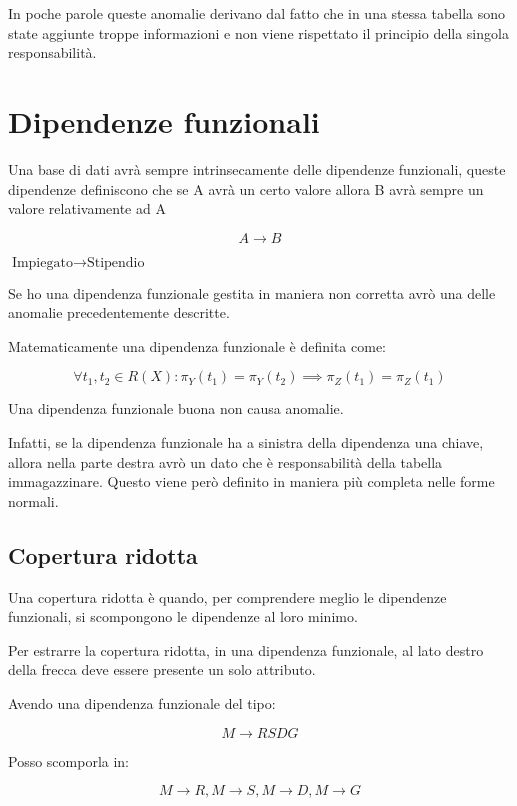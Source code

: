 In poche parole queste anomalie derivano dal fatto che in una stessa tabella sono state aggiunte troppe informazioni e non viene rispettato il principio della singola responsabilità.

\section{Dipendenze funzionali}

Una base di dati avrà sempre intrinsecamente delle dipendenze funzionali, queste dipendenze definiscono che se A avrà un certo valore allora B avrà sempre un valore relativamente ad A

\[ A \rightarrow B\]

\begin{exmp}
    $\text{Impiegato} \rightarrow \text{Stipendio}$
\end{exmp} 

Se ho una dipendenza funzionale gestita in maniera non corretta avrò una delle anomalie precedentemente descritte.

Matematicamente una dipendenza funzionale è definita come:

\[\forall t_1,t_2 \in R(X) : \pi_Y(t_1) = \pi_Y(t_2) \implies \pi_Z(t_1) = \pi_Z(t_1) \]


Una dipendenza funzionale buona non causa anomalie.

Infatti, se la dipendenza funzionale ha a sinistra della dipendenza una chiave, allora nella parte destra avrò un dato che è responsabilità della tabella immagazzinare. Questo viene però definito in maniera più completa nelle forme normali.

\subsection{Copertura ridotta}

Una copertura ridotta è quando, per comprendere meglio le dipendenze funzionali, si scompongono le dipendenze al loro minimo.

Per estrarre la copertura ridotta, in una dipendenza funzionale, al lato destro della frecca deve essere presente un solo attributo.

\begin{exmp}
    Avendo una dipendenza funzionale del tipo:

    \[M \rightarrow RSDG\]

    Posso scomporla in:

    \[M \rightarrow R, M \rightarrow S,M \rightarrow D,M \rightarrow G\]

\end{exmp}



